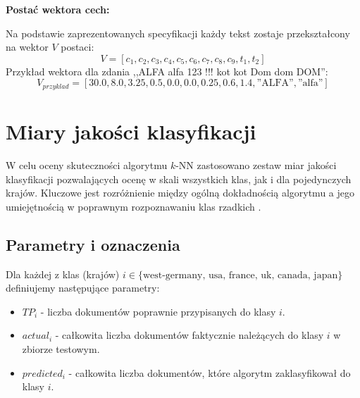 \documentclass{article}
\begin{document}
	\textbf{Postać wektora cech:}
	
	Na podstawie zaprezentowanych specyfikacji każdy tekst zostaje przekształcony na wektor \(V\) postaci:
	\begin{equation}
		V = [c_1, c_2, c_3, c_4, c_5, c_6, c_7, c_8, c_9, t_1, t_2]
	\end{equation}
	Przykład wektora dla zdania ,,ALFA alfa 123 !!! kot kot Dom dom DOM'':
	\begin{equation}
		V_{przyklad} = [30.0, 8.0, 3.25, 0.5, 0.0, 0.0, 0.25, 0.6, 1.4, \text{''ALFA''}, \text{''alfa''}]
	\end{equation}
	
	\section{Miary jakości klasyfikacji} 
	W celu oceny skuteczności algorytmu \(k\)-NN zastosowano zestaw miar jakości klasyfikacji pozwalających ocenę w skali wszystkich klas, jak i dla pojedynczych krajów. Kluczowe jest rozróżnienie między ogólną dokładnością algorytmu a jego umiejętnością w poprawnym rozpoznawaniu klas rzadkich \cite{tadeusiewicz90}.
	
	\subsection{Parametry i oznaczenia}
	Dla każdej z klas (krajów) \(i \in \{ \text{west-germany, usa, france, uk, canada, japan}\}\) definiujemy następujące parametry:
	\begin{itemize}
		\item \(TP_i\) - liczba dokumentów poprawnie przypisanych do klasy \(i\).
		\item \(actual_i\) - całkowita liczba dokumentów faktycznie należących do klasy \(i\) w zbiorze testowym.
		\item \(predicted_i\) - całkowita liczba dokumentów, które algorytm zaklasyfikował do klasy \(i\).
	\end{itemize}
	
\end{document}
